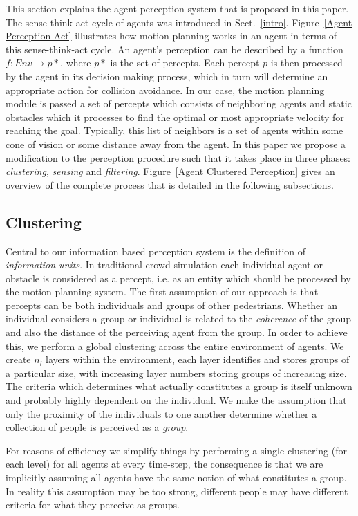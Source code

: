 \documentclass[runningheads,a4paper]{llncs}
\begin{document}
This section explains the agent perception system that is proposed in this paper. The sense-think-act cycle of agents was introduced in Sect.~\ref{intro}. Figure~\ref{Agent Perception Act} illustrates how motion planning works in an agent in terms of this sense-think-act cycle. An agent's perception can be described by a function $f: Env\rightarrow p*$, where $p*$ is the set of percepts. Each percept $p$ is then processed by the agent in its decision making process, which in turn will determine an appropriate action for collision avoidance. In our case, the motion planning module is passed a set of percepts which consists of neighboring agents and static obstacles which it processes to find the optimal or most appropriate velocity for reaching the goal. Typically, this list of neighbors is a set of agents within some cone of vision or some distance away from the agent. In this paper we propose a modification to the perception procedure such that it takes place in three phases: \emph{clustering}, \emph{sensing} and \emph{filtering}. Figure~\ref{Agent Clustered Perception} gives an overview of the complete process that is detailed in the following subsections.

\subsection{Clustering}
\label{ClusteringSection}
Central to our information based perception system is the definition of \emph{information units}. In traditional crowd simulation each individual agent or obstacle is considered as a percept, i.e. as an entity which should be processed by the motion planning system. The first assumption of our approach is that percepts can be both individuals and groups of other pedestrians. Whether an individual considers a group or individual is related to the {\em coherence} of the group and also the distance of the perceiving agent from the group. In order to achieve this, we perform a global clustering across the entire environment of agents. We create $n_l$ layers within the environment, each layer identifies and stores groups of a particular size, with increasing layer numbers storing groups of increasing size. The criteria which determines what actually constitutes a group is itself unknown and probably highly dependent on the individual. We make the assumption that only the proximity of the individuals to one another determine whether a collection of people is perceived as a {\em group}. 

For reasons of efficiency we simplify things by performing a single clustering (for each level) for all agents at every time-step, the consequence is that we are implicitly assuming all agents have the same notion of what constitutes a group. In reality this assumption may be too strong, different people may have different criteria for what they perceive as groups. 
\end{document}
